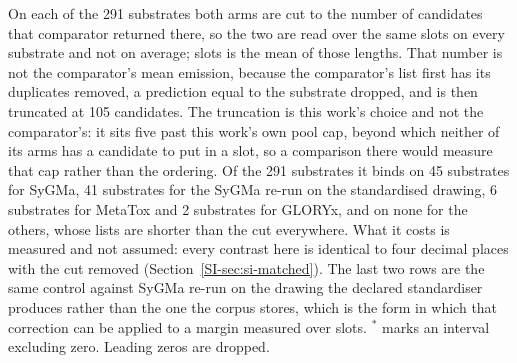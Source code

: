 \begin{table}[t]
\begin{threeparttable}
\begin{tablenotes}[flushleft]
\item On each of the 291 substrates both arms are cut to the number of candidates that comparator returned there, so the two are read over the same slots on every substrate and not on average; slots is the mean of those lengths. That number is not the comparator's mean emission, because the comparator's list first has its duplicates removed, a prediction equal to the substrate dropped, and is then truncated at 105 candidates. The truncation is this work's choice and not the comparator's: it sits five past this work's own pool cap, beyond which neither of its arms has a candidate to put in a slot, so a comparison there would measure that cap rather than the ordering. Of the 291 substrates it binds on 45 substrates for SyGMa, 41 substrates for the SyGMa re-run on the standardised drawing, 6 substrates for MetaTox and 2 substrates for GLORYx, and on none for the others, whose lists are shorter than the cut everywhere. What it costs is measured and not assumed: every contrast here is identical to four decimal places with the cut removed (Section~\ref{SI-sec:si-matched}). The last two rows are the same control against SyGMa re-run on the drawing the declared standardiser produces rather than the one the corpus stores, which is the form in which that correction can be applied to a margin measured over slots. $^{*}$ marks an interval excluding zero. Leading zeros are dropped.
\end{tablenotes}
\end{threeparttable}
\end{table}
